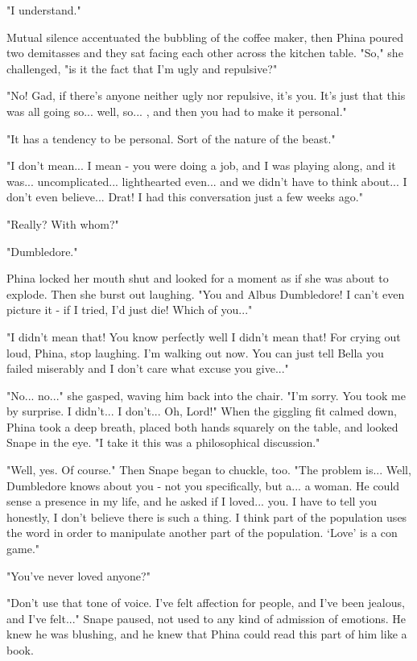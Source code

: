 \documentclass[a4paper,11pt]{article}
\begin{document}
"I understand."

Mutual silence accentuated the bubbling of the coffee maker, then Phina poured two demitasses and they sat facing each other across the kitchen table. "So," she challenged, "is it the fact that I'm ugly and repulsive?"

"No! Gad, if there's anyone neither ugly nor repulsive, it's you. It's just that this was all going so... well, so... , and then you had to make it personal."

"It has a tendency to be personal. Sort of the nature of the beast."

"I don't mean... I mean - you were doing a job, and I was playing along, and it was... uncomplicated... lighthearted even... and we didn't have to think about... I don't even believe... Drat! I had this conversation just a few weeks ago."

"Really? With whom?"

"Dumbledore."

Phina locked her mouth shut and looked for a moment as if she was about to explode. Then she burst out laughing. "You and Albus Dumbledore! I can't even picture it - if I tried, I'd just die! Which of you..."

"I didn't mean that! You know perfectly well I didn't mean that! For crying out loud, Phina, stop laughing. I'm walking out now. You can just tell Bella you failed miserably and I don't care what excuse you give..."

"No... no..." she gasped, waving him back into the chair. "I'm sorry. You took me by surprise. I didn't... I don't... Oh, Lord!" When the giggling fit calmed down, Phina took a deep breath, placed both hands squarely on the table, and looked Snape in the eye. "I take it this was a philosophical discussion."

"Well, yes. Of course." Then Snape began to chuckle, too. "The problem is... Well, Dumbledore knows about you - not you specifically, but a... a woman. He could sense a presence in my life, and he asked if I loved... you. I have to tell you honestly, I don't believe there is such a thing. I think part of the population uses the word in order to manipulate another part of the population. `Love' is a con game."

"You've never loved anyone?"

"Don't use that tone of voice. I've felt affection for people, and I've been jealous, and I've felt..." Snape paused, not used to any kind of admission of emotions. He knew he was blushing, and he knew that Phina could read this part of him like a book.
\end{document}
